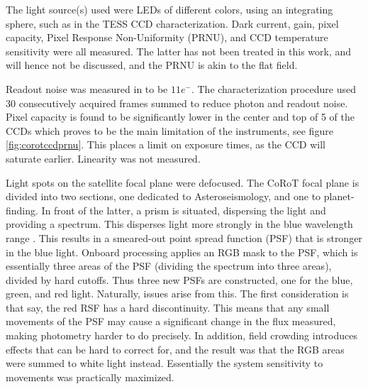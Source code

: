 \documentclass[../main.tex]{subfiles}
\begin{document}
The light source(s) used were LEDs of different colors, using an integrating sphere, such as in the TESS CCD characterization. Dark current, gain, pixel capacity, Pixel Response Non-Uniformity (PRNU), and CCD temperature sensitivity were all measured. The latter has not been treated in this work, and will hence not be discussed, and the PRNU is akin to the flat field. 

Readout noise was measured in \cite{corotCharCCD2} to be $11 e^- $.
The characterization procedure used $30$ consecutively acquired frames summed to reduce photon and readout noise. Pixel capacity is found to be significantly lower in the center and top of 5 of the CCDs which proves to be the main limitation of the instruments, see figure \ref{fig:corotccdprnu}. This places a limit on exposure times, as the CCD will saturate earlier. Linearity was not measured.

Light spots on the satellite focal plane were defocused. The CoRoT focal plane is divided into two sections, one dedicated to Asteroseismology, and one to planet-finding. In front of the latter, a prism is situated, dispersing the light and providing a spectrum. This disperses light more strongly in the blue wavelength range \cite{refId0}. This results in a smeared-out point spread function (PSF) that is stronger in the blue light. Onboard processing applies an RGB mask to the PSF, which is essentially three areas of the PSF (dividing the spectrum into three areas), divided by hard cutoffs. Thus three new PSFs are constructed, one for the blue, green, and red light.
Naturally, issues arise from this. The first consideration is that say, the red RSF has a hard discontinuity. This means that any small movements of the PSF may cause a significant change in the flux measured, making photometry harder to do precisely. In addition, field crowding introduces effects that can be hard to correct for, and the result was that the RGB areas were summed to white light instead. Essentially the system sensitivity to movements was practically maximized. 
\end{document}
